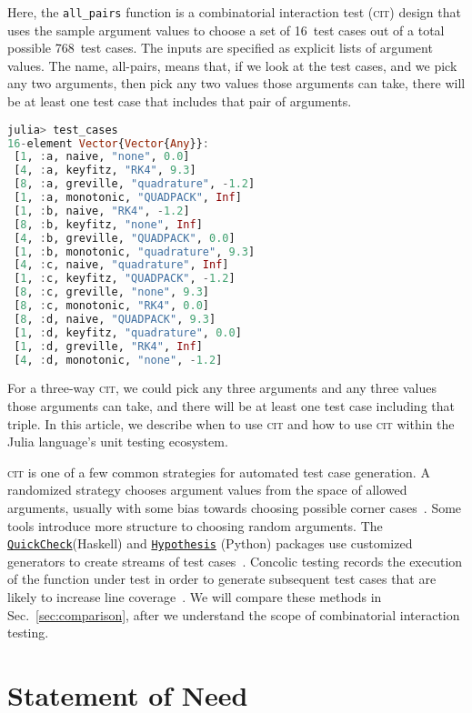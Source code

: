 \documentclass{juliacon}
\newcommand{\cit}{\textsc{cit}\xspace}
\begin{document}
Here, the \verb|all_pairs| function is a combinatorial interaction test (\cit) design that uses the sample argument values to choose a set of 16~test cases out of a total possible 768~test cases. The inputs are specified as explicit lists of argument values. The name, all-pairs, means that, if we look at the test cases, and we pick any two arguments, then pick any two values those arguments can take, there will be at least one test case that includes that pair of arguments.
\begin{lstlisting}[language=Julia]
julia> test_cases
16-element Vector{Vector{Any}}:
 [1, :a, naive, "none", 0.0]
 [4, :a, keyfitz, "RK4", 9.3]
 [8, :a, greville, "quadrature", -1.2]
 [1, :a, monotonic, "QUADPACK", Inf]
 [1, :b, naive, "RK4", -1.2]
 [8, :b, keyfitz, "none", Inf]
 [4, :b, greville, "QUADPACK", 0.0]
 [1, :b, monotonic, "quadrature", 9.3]
 [4, :c, naive, "quadrature", Inf]
 [1, :c, keyfitz, "QUADPACK", -1.2]
 [8, :c, greville, "none", 9.3]
 [8, :c, monotonic, "RK4", 0.0]
 [8, :d, naive, "QUADPACK", 9.3]
 [1, :d, keyfitz, "quadrature", 0.0]
 [1, :d, greville, "RK4", Inf]
 [4, :d, monotonic, "none", -1.2]
\end{lstlisting}
For a three-way \cit, we could pick any three arguments and any three values those arguments can take, and there will be at least one test case including that triple. In this article, we describe when to use \cit and how to use \cit within the Julia language's unit testing ecosystem.

\vskip 6pt
\cit is one of a few common strategies for automated test case generation. A randomized strategy chooses argument values from the space of allowed arguments, usually with some bias towards choosing possible corner cases~\cite{Lampropoulos2020-sd,Arcuri2012-az}. Some tools introduce more structure to choosing random arguments. The \href{https://hackage.haskell.org/package/QuickCheck}{\texttt{QuickCheck}}(Haskell) and \href{https://github.com/HypothesisWorks/hypothesis}{\texttt{Hypothesis}} (Python) packages use customized generators to create streams of test cases~\cite{loscher2018automating}. Concolic testing records the execution of the function under test in order to generate subsequent test cases that are likely to increase line coverage~\cite{King1976-jt,Wang2018-xh,vira2019}. We will compare these methods in Sec.~\ref{sec:comparison}, after we understand the scope of combinatorial interaction testing.


\section{Statement of Need}\label{sec:statement-of-need}
\end{document}
